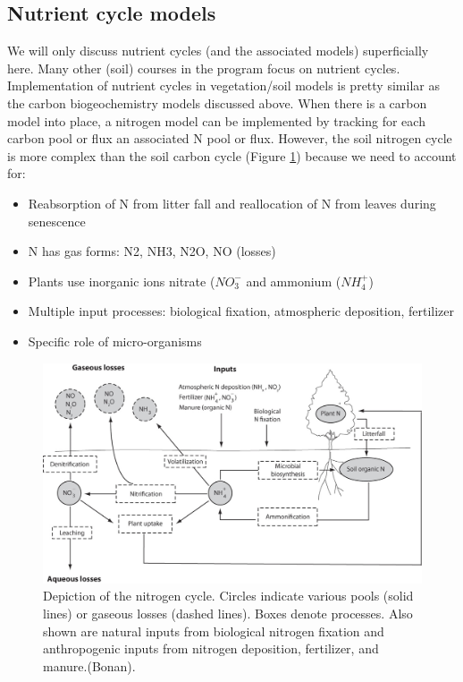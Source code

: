\documentclass[12pt,oneside]{book}
\providecommand{\tightlist}{%
  \setlength{\itemsep}{0pt}\setlength{\parskip}{0pt}}
\begin{document}
\subsection{Nutrient cycle models}\label{nutrient-cycle-models}

We will only discuss nutrient cycles (and the associated models)
superficially here. Many other (soil) courses in the program focus on
nutrient cycles. Implementation of nutrient cycles in vegetation/soil
models is pretty similar as the carbon biogeochemistry models discussed
above. When there is a carbon model into place, a nitrogen model can be
implemented by tracking for each carbon pool or flux an associated N
pool or flux. However, the soil nitrogen cycle is more complex than the
soil carbon cycle (Figure \ref{fig:f519}) because we need to account
for:

\begin{itemize}
\tightlist
\item
  Reabsorption of N from litter fall and reallocation of N from leaves
  during senescence
\item
  N has gas forms: N2, NH3, N2O, NO (losses)
\item
  Plants use inorganic ions nitrate (\(NO_3^{-}\) and ammonium
  (\(NH_4^{+}\))
\item
  Multiple input processes: biological fixation, atmospheric deposition,
  fertilizer
\item
  Specific role of micro-organisms
\end{itemize}

\begin{figure}

{\centering \includegraphics[width=0.8\linewidth]{figures/chap5/f519_N_cycle} 

}

\caption{Depiction of the nitrogen cycle. Circles indicate various pools (solid lines) or gaseous losses (dashed lines). Boxes denote processes. Also shown are natural inputs from biological nitrogen fixation and anthropogenic inputs from nitrogen deposition, fertilizer, and manure.(Bonan).}\label{fig:f519}
\end{figure}
\end{document}

